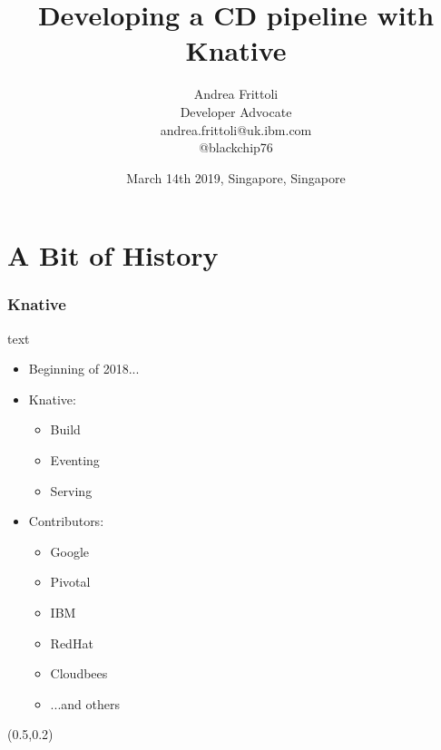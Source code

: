 \documentclass[aspectratio=169,11pt,hyperref={colorlinks=true}]{beamer}
\title{Developing a CD pipeline with Knative}
\date[DevOps Meetup]{March 14th 2019, Singapore, Singapore}
\author[Andrea]{
  Andrea Frittoli \\
  Developer Advocate \\
  andrea.frittoli@uk.ibm.com \\
  @blackchip76
}
\institute[DevOpsMeetupSingapore]{
  DevOps Meetup Singapore
}
\begin{document}
\begin{frame}[noframenumbering]
\titlepage{}
\end{frame}



\section{A Bit of History}

\begin{lblackrwhiteframe}
  \frametitle{Knative}
  \large
  \begin{beamercolorbox}[wd=0.3\paperwidth]{text}
    \begin{itemize}
      \item Beginning of 2018...
      \item Knative:
      \begin{itemize}
        \item Build
        \item Eventing
        \item Serving
      \end{itemize}
    \end{itemize}
    \begin{itemize}
      \item Contributors:
      \begin{itemize}
        \item Google
        \item Pivotal
        \item IBM
        \item RedHat
        \item Cloudbees
        \item ...and others
      \end{itemize}
    \end{itemize}
  \end{beamercolorbox}%
  \begin{textblock*}{0.5\paperwidth}(0.5\paperwidth,0.2\paperheight)
    \centering

\end{textblock*}
\end{lblackrwhiteframe}
\end{document}
